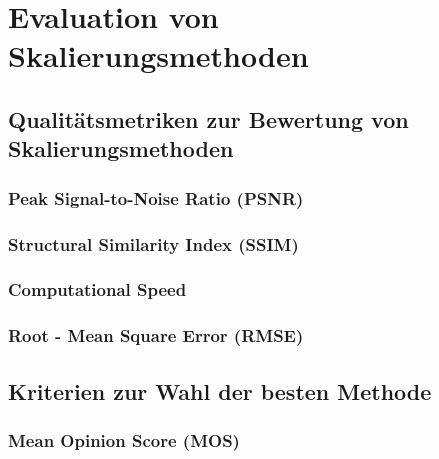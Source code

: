 
\chapter{Evaluation von Skalierungsmethoden}

\section{Qualitätsmetriken zur Bewertung von Skalierungsmethoden}
\subsection{Peak Signal-to-Noise Ratio (PSNR)}
\subsection{Structural Similarity Index (SSIM)}
\subsection{Computational Speed}
\subsection{Root - Mean Square Error (RMSE)}


\section{Kriterien zur Wahl der besten Methode}
\subsection{Mean Opinion Score (MOS)}